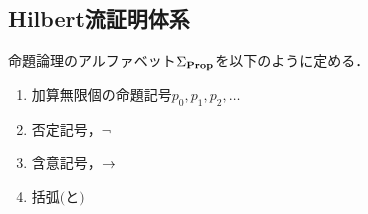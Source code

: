 \subsection{Hilbert流証明体系}

\begin{myDefinition}
  命題論理のアルファベット$\Sigma_{\mathbf{Prop}}$を以下のように定める．
  \begin{enumerate}
    \item 加算無限個の命題記号$p_0,p_1,p_2,\dots$
    \item 否定記号，$\neg$
    \item 含意記号，$\to$
    \item 括弧$($と$)$
  \end{enumerate}
\end{myDefinition}
